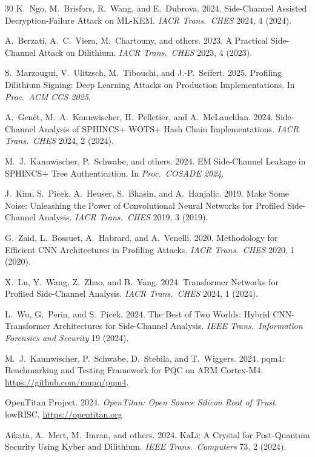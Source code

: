 \documentclass[sigconf,nonacm]{acmart}
\begin{document}
\begin{thebibliography}{30}
K.~Ngo, M.~Brisfors, R.~Wang, and E.~Dubrova. 2024. Side-Channel
Assisted Decryption-Failure Attack on ML-KEM.
\textit{IACR Trans.\ CHES} 2024, 4 (2024).

A.~Berzati, A.~C.~Viera, M.~Chartouny, and others. 2023. A Practical
Side-Channel Attack on Dilithium. \textit{IACR Trans.\ CHES} 2023, 4
(2023).

S.~Marzougui, V.~Ulitzsch, M.~Tibouchi, and J.-P.~Seifert. 2025.
Profiling Dilithium Signing: Deep Learning Attacks on Production
Implementations. In \textit{Proc.\ ACM CCS 2025}.

A.~Gen\^et, M.~A.~Kannwischer, H.~Pelletier, and A.~McLauchlan. 2024.
Side-Channel Analysis of SPHINCS+ WOTS+ Hash Chain Implementations.
\textit{IACR Trans.\ CHES} 2024, 2 (2024).

M.~J.~Kannwischer, P.~Schwabe, and others. 2024. EM Side-Channel
Leakage in SPHINCS+ Tree Authentication.
In \textit{Proc.\ COSADE 2024}.

J.~Kim, S.~Picek, A.~Heuser, S.~Bhasin, and A.~Hanjalic. 2019. Make
Some Noise: Unleashing the Power of Convolutional Neural Networks for
Profiled Side-Channel Analysis. \textit{IACR Trans.\ CHES} 2019, 3
(2019).

G.~Zaid, L.~Bossuet, A.~Habrard, and A.~Venelli. 2020. Methodology for
Efficient CNN Architectures in Profiling Attacks. \textit{IACR Trans.\
CHES} 2020, 1 (2020).

X.~Lu, Y.~Wang, Z.~Zhao, and B.~Yang. 2024. Transformer Networks for
Profiled Side-Channel Analysis. \textit{IACR Trans.\ CHES} 2024, 1
(2024).

L.~Wu, G.~Perin, and S.~Picek. 2024. The Best of Two Worlds:
Hybrid CNN-Transformer Architectures for Side-Channel Analysis.
\textit{IEEE Trans.\ Information Forensics and Security} 19 (2024).

M.~J.~Kannwischer, P.~Schwabe, D.~Stebila, and T.~Wiggers. 2024.
pqm4: Benchmarking and Testing Framework for PQC on ARM Cortex-M4.
\url{https://github.com/mupq/pqm4}.

OpenTitan Project. 2024. \textit{OpenTitan: Open Source Silicon Root
of Trust}. lowRISC. \url{https://opentitan.org}

Aikata, A.~Mert, M.~Imran, and others. 2024. KaLi: A Crystal for
Post-Quantum Security Using Kyber and Dilithium. \textit{IEEE Trans.\
Computers} 73, 2 (2024).


\end{thebibliography}
\end{document}
